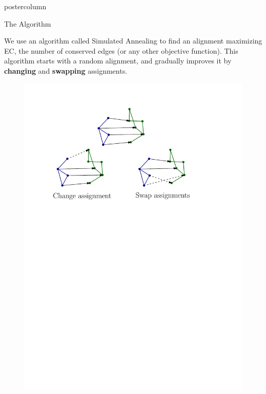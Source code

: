 \documentclass[final,hyperref={pdfpagelabels=false}]{beamer}
\newlength{\columnheight}
\begin{document}
\begin{frame}
\begin{columns}
    \begin{column}{.49\textwidth}
      \begin{beamercolorbox}[center,wd=\textwidth]{postercolumn}
        \begin{minipage}[T]{.95\textwidth} %
          \parbox[t][\columnheight]{\textwidth}{ %
            
            
            
            
            \begin{block}{The Algorithm}

We use an algorithm called Simulated Annealing to find an alignment maximizing EC, the number of conserved edges (or any other objective function). This algorithm starts with a random alignment, and gradually improves it by \textbf{changing} and \textbf{swapping} assignments.

\begin{figure}
\centering
\includegraphics[width=0.55\linewidth]{../figures/operatorssimplified}
\label{fig:operatorssimplified}
\end{figure}             
              

\end{block}}
\end{minipage}
\end{beamercolorbox}
\end{column}
\end{columns}
\end{frame}
\end{document}
